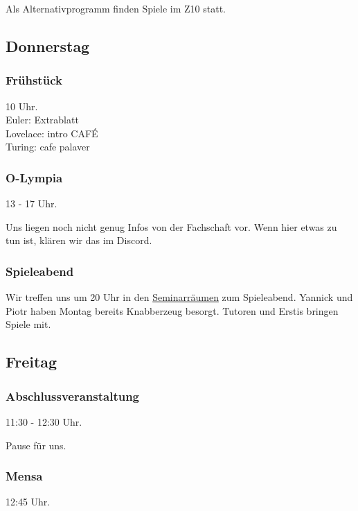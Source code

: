 \documentclass[10pt,ngerman]{scrartcl}
\begin{document}
\begin{multicols}{2}
Als Alternativprogramm finden Spiele im Z10 statt.



\subsection{Donnerstag}

\subsubsection{Frühstück}

10 Uhr. \\
Euler: Extrablatt \\
Lovelace: intro CAFÉ \\
Turing: cafe palaver

\subsubsection{O-Lympia}

13 - 17 Uhr.

Uns liegen noch nicht genug Infos von der Fachschaft vor.
Wenn hier etwas zu tun ist, klären wir das im Discord.

\subsubsection{Spieleabend}

Wir treffen uns um 20 Uhr in den \hyperref[rooms]{Seminarräumen} zum Spieleabend.
Yannick und Piotr haben Montag bereits Knabberzeug besorgt.
Tutoren und Erstis bringen Spiele mit.



\subsection{Freitag}

\subsubsection{Abschlussveranstaltung}

11:30 - 12:30 Uhr.

Pause für uns.

\subsubsection{Mensa}

12:45 Uhr.


\end{multicols}
\end{document}
